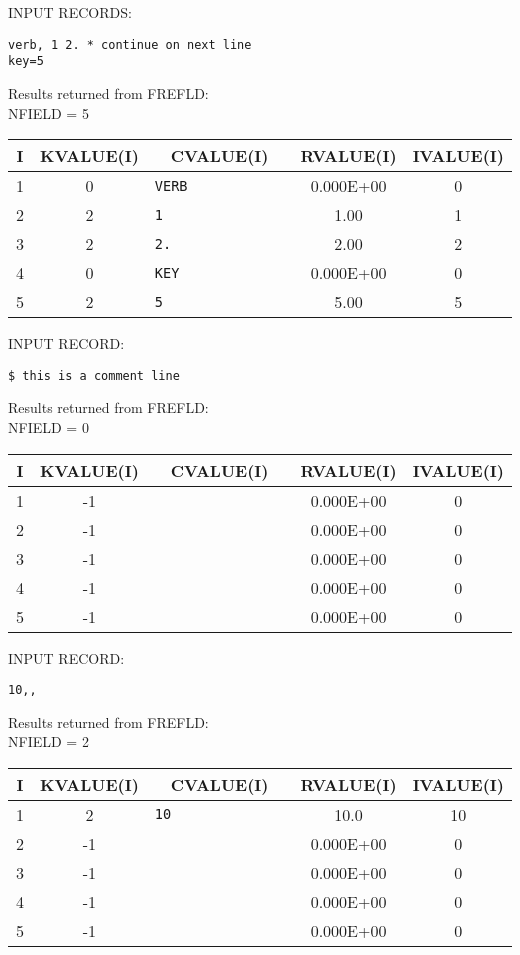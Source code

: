 INPUT RECORDS:\\
\begin{verbatim}
verb, 1 2. * continue on next line
key=5
\end{verbatim}

Results returned from FREFLD:\\
NFIELD = 5

\begin{tabular}{|ccccc|} \hline \hline
I    &  KVALUE(I) &       CVALUE(I)  &        RVALUE(I)   &  IVALUE(I)\\\hline
   1   &      0 &\verb*"VERB            " & 0.000E+00 & 0\\
   2   &      2 &\verb*"1               " & 1.00     & 1\\
   3   &      2 &\verb*"2.              " & 2.00     & 2\\
   4   &      0 &\verb*"KEY             " & 0.000E+00 & 0\\
   5   &      2 &\verb*"5               " & 5.00     & 5\\ \hline \hline
\end{tabular}

INPUT RECORD:
\begin{verbatim}
$ this is a comment line
\end{verbatim}

Results returned from FREFLD:\\
NFIELD = 0

\begin{tabular}{|ccccc|} \hline \hline
I    &  KVALUE(I)  &      CVALUE(I)    &     RVALUE(I) &    IVALUE(I)\\\hline
1 &-1 &\verb*"                "  &    0.000E+00 & 0\\
2 &-1 &\verb*"                "  &    0.000E+00 & 0\\
3 &-1 &\verb*"                "  &    0.000E+00 & 0\\
4 &-1 &\verb*"                "  &    0.000E+00 & 0\\
5 &-1 &\verb*"                "  &    0.000E+00 & 0\\ \hline \hline
\end{tabular}

INPUT RECORD:
\begin{verbatim}
10,,
\end{verbatim}

Results returned from FREFLD:\\  
NFIELD =    2

\begin{tabular}{|ccccc|} \hline \hline
I    &  KVALUE(I) &       CVALUE(I)       &   RVALUE(I)   &  IVALUE(I)\\\hline
1  &  2  &\verb*"10              "  &     10.0     &  10\\
2  & -1  &\verb*"                "  &    0.000E+00 &  0\\
3  & -1  &\verb*"                "  &    0.000E+00 &  0\\
4  & -1  &\verb*"                "  &    0.000E+00 &  0\\
5  & -1  &\verb*"                "  &    0.000E+00 &  0\\ \hline \hline
\end{tabular}

